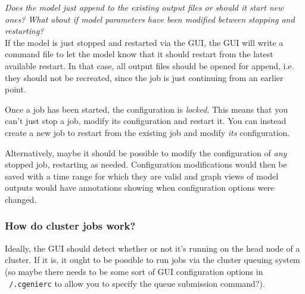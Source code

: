 \documentclass[a4paper,11pt,article]{memoir}
\begin{document}
\emph{Does the model just append to the existing output files or
  should it start new ones?  What about if model parameters have been
  modified between stopping and restarting?} \\

If the model is just stopped and restarted via the GUI, the GUI will
write a command file to let the model know that it should restart from
the latest available restart.  In that case, all output files should
be opened for append, i.e. they should not be recreated, since the job
is just continuing from an earlier point.

Once a job has been started, the configuration is \emph{locked}.  This
means that you can't just stop a job, modify its configuration and
restart it.  You can instead create a new job to restart from the
existing job and modify \emph{its} configuration.

Alternatively, maybe it should be possible to modify the configuration
of \emph{any} stopped job, restarting as needed.  Configuration
modifications would then be saved with a time range for which they are
valid and graph views of model outputs would have annotations showing
when configuration options were changed.

\subsubsection*{How do cluster jobs work?}

Ideally, the GUI should detect whether or not it's running on the head
node of a cluster.  If it is, it ought to be possible to run jobs via
the cluster queuing system (so maybe there needs to be some sort of
GUI configuration options in \texttt{~/.cgenierc} to allow you to
specify the queue submission command?).
\end{document}
